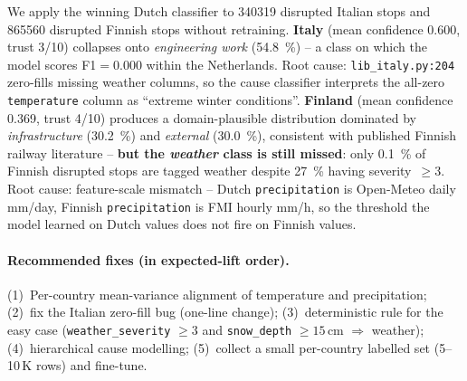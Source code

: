 We apply the winning Dutch classifier to \num{340319} disrupted Italian stops and \num{865560} disrupted Finnish stops without retraining. \textbf{Italy} (mean confidence \num{0.600}, trust 3/10) collapses onto \emph{engineering work} (\SI{54.8}{\percent}) -- a class on which the model scores F1$=\num{0.000}$ within the Netherlands. Root cause: \texttt{lib\_italy.py:204} zero-fills missing weather columns, so the cause classifier interprets the all-zero \texttt{temperature} column as ``extreme winter conditions''. \textbf{Finland} (mean confidence \num{0.369}, trust 4/10) produces a domain-plausible distribution dominated by \emph{infrastructure} (\SI{30.2}{\percent}) and \emph{external} (\SI{30.0}{\percent}), consistent with published Finnish railway literature -- \textbf{but the \emph{weather} class is still missed}: only \SI{0.1}{\percent} of Finnish disrupted stops are tagged weather despite \SI{27}{\percent} having severity~$\geq 3$. Root cause: feature-scale mismatch -- Dutch \texttt{precipitation} is Open-Meteo daily mm/day, Finnish \texttt{precipitation} is FMI hourly mm/h, so the threshold the model learned on Dutch values does not fire on Finnish values.

\paragraph{Recommended fixes (in expected-lift order).} (1)~Per-country mean-variance alignment of temperature and precipitation; (2)~fix the Italian zero-fill bug (one-line change); (3)~deterministic rule for the easy case (\texttt{weather\_severity} $\geq 3$ and \texttt{snow\_depth} $\geq 15$\,cm $\Rightarrow$ weather); (4)~hierarchical cause modelling; (5)~collect a small per-country labelled set (5--10\,K rows) and fine-tune.
